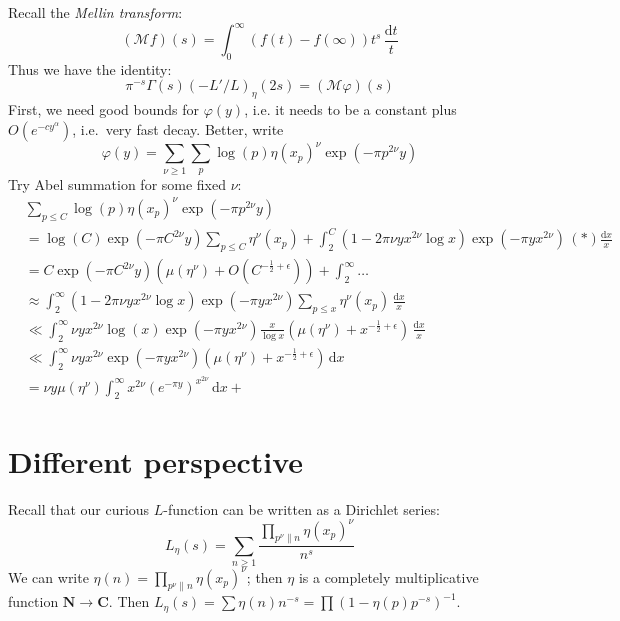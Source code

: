 \documentclass{article}
\newcommand{\bC}{\mathbf{C}}
\newcommand{\bN}{\mathbf{N}}
\newcommand{\cM}{\mathcal{M}}
\newcommand{\dd}{\mathrm{d}}
\theoremstyle{definition}
\begin{document}
Recall the \emph{Mellin transform}:
\[
	(\cM f)(s) = \int_0^\infty (f(t)-f(\infty))t^s\, \frac{\dd t}{t}
\]
Thus we have the identity:
\[
	\pi^{-s} \Gamma(s) (-L'/L)_\eta(2s) = (\cM \varphi)(s)
\]
First, we need good bounds for $\varphi(y)$, i.e. it needs to be a constant 
plus $O(e^{-c y^\alpha})$, i.e.~very fast decay. Better, write 
\[
	\varphi(y) = \sum_{\nu\geqslant 1}\sum_p  \log(p) \eta(x_p)^\nu \exp(-\pi p^{2\nu}y)
\]
Try Abel summation for some fixed $\nu$:
\begin{align*}
	& \sum_{p\leqslant C}\log(p) \eta(x_p)^\nu \exp(-\pi p^{2\nu}y) \\
		&= \log(C)\exp(-\pi C^{2\nu} y) \sum_{p\leqslant C} \eta^\nu(x_p) + \int_2^C (1-2\pi \nu y x^{2\nu}\log x) \exp(-\pi y x^{2\nu})\,(*) \frac{\dd x}{x} \\
		&= C \exp(-\pi C^{2\nu} y) (\mu(\eta^\nu)+O(C^{-\frac 1 2+\epsilon})) + \int_2^\infty \ldots \\
		&\approx \int_2^\infty (1-2\pi \nu y x^{2\nu}\log x) \exp(-\pi y x^{2\nu})\sum_{p\leqslant x} \eta^\nu(x_p)\, \frac{\dd x}{x} \\
		&\ll \int_2^\infty \nu y x^{2\nu}\log(x) \exp(-\pi y x^{2\nu}) \frac{x}{\log x}(\mu(\eta^\nu) + x^{-\frac 1 2+\epsilon})\, \frac{\dd x}{x} \\
		&\ll \int_2^\infty \nu y x^{2\nu} \exp(-\pi y x^{2\nu})(\mu(\eta^\nu)+x^{-\frac 1 2+\epsilon})\, \dd x \\
		&= \nu y \mu(\eta^\nu) \int_2^\infty x^{2\nu} (e^{-\pi y})^{ x^{2\nu}}\, \dd x + 
\end{align*}





\section{Different perspective}

Recall that our curious $L$-function can be written as a Dirichlet series:
\[
	L_\eta(s) = \sum_{n\geqslant 1} \frac{\prod_{p^\nu \| n} \eta(x_p)^\nu}{n^s}
\]
We can write $\eta(n) = \prod_{p^\nu\| n} \eta(x_p)^\nu$; then $\eta$ is a 
completely multiplicative function $\bN\to \bC$. Then 
$L_\eta(s) = \sum \eta(n) n^{-s} = \prod (1-\eta(p) p^{-s})^{-1}$. 
\end{document}
